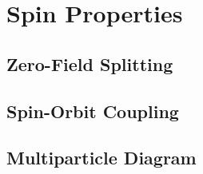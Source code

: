 \section{Spin Properties}
\subsection{Zero-Field Splitting}

\subsection{Spin-Orbit Coupling}

\subsection{Multiparticle Diagram}
